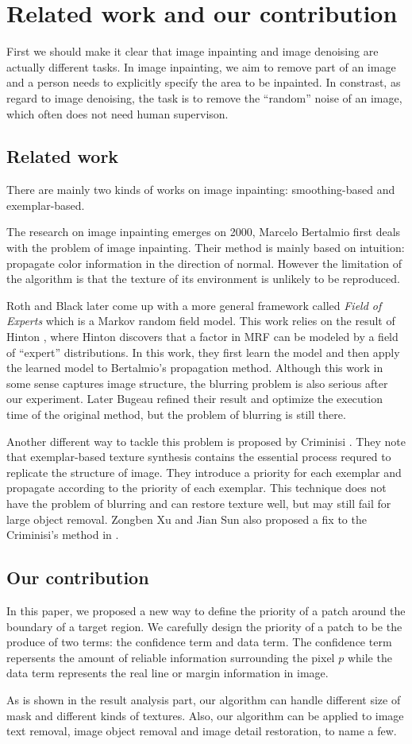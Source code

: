 \section{Related work and our contribution}
First we should make it clear that image inpainting and image denoising are
actually different tasks. In image inpainting, we aim to remove part of 
an image and a person needs to explicitly specify the area to be inpainted.
In constrast, as regard to image denoising, the task is to remove the 
``random'' noise of an image, which often does not need human supervison.
\subsection{Related work}
There are mainly two kinds of works on image inpainting: smoothing-based and
exemplar-based.

The research on image inpainting emerges on 2000, Marcelo Bertalmio \etal
\cite{siggraph00} first deals with the problem of image inpainting. Their
method is mainly based on intuition: propagate color information in the
direction of normal. However the limitation of the algorithm is that the
texture of its environment is unlikely to be reproduced.

Roth and Black \cite{cvpr05} later come up with a more general framework 
called \emph{Field of Experts} which is a Markov random field model. This
work relies on the result of Hinton \cite{neco02, nips02}, where Hinton discovers
that a factor in MRF can be modeled by a field of ``expert'' distributions.
In this work, they first learn the model and then apply the learned model
to Bertalmio's propagation method. Although this work in some sense captures
image structure, the blurring problem is also serious after our experiment. Later Bugeau\etal \cite{tip10} refined their result and optimize the execution time of the original method, but the problem of blurring is still there.

Another different way to tackle this problem is proposed by Criminisi \etal
 \cite{cvpr03,tip04}. They note that exemplar-based texture synthesis
 contains the essential process requred to replicate the structure of image.
 They introduce a priority for each exemplar and propagate according to
 the priority of each exemplar. This technique does not have the problem
 of blurring and can restore texture well, but may still fail for large
 object removal. Zongben Xu and Jian Sun also proposed a fix to the Criminisi's method in \cite{tip10sj}.

\subsection{Our contribution}
In this paper, we proposed a new way to define the priority of a patch 
around the boundary of a target region. We carefully design the priority of a patch to be the produce of two terms: the confidence term and data term.
The confidence term repersents the amount of reliable information surrounding the pixel $p$ while the data term represents the real line or margin information in image.

As is shown in the result analysis part, our algorithm can handle different size of mask and different kinds of textures. Also, our algorithm can be applied to image text removal, image object removal and image detail restoration, to name a few.
